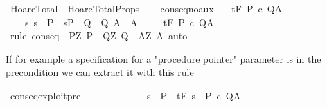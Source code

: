 %
\begin{isabellebody}%
%
%
\isamarkuptrue%
%
\isadelimtheory
%
\endisadelimtheory
%
\isatagtheory
{}\isamarkupfalse%
\ HoareTotal\ \ HoareTotalProps\ %
\endisatagtheory
{\isafoldtheory}%
%
\isadelimtheory
%
\endisadelimtheory
\ \isanewline
\isanewline
{}\isamarkupfalse%
\ conseq{\isacharunderscore}no{\isacharunderscore}aux{\isacharcolon}\isanewline
\ \ {\isachardoublequoteopen}{\isasymlbrakk}{\isasymGamma}{\isacharcomma}{\isasymTheta}\ {\isasymturnstile}\isactrlsub t\isactrlbsub {\isacharslash}F\isactrlesub \ P{\isacharprime}\ c\ Q{\isacharprime}{\isacharcomma}A{\isacharprime}{\isacharsemicolon}\isanewline
\ \ \ \ {\isasymforall}s{\isachardot}\ s\ {\isasymin}\ P\ {\isasymlongrightarrow}\ {\isacharparenleft}s{\isasymin}P{\isacharprime}\ {\isasymand}\ {\isacharparenleft}Q{\isacharprime}\ {\isasymsubseteq}\ Q{\isacharparenright}{\isasymand}\ {\isacharparenleft}A{\isacharprime}\ {\isasymsubseteq}\ A{\isacharparenright}{\isacharparenright}{\isasymrbrakk}\isanewline
\ \ {\isasymLongrightarrow}\isanewline
\ \ {\isasymGamma}{\isacharcomma}{\isasymTheta}{\isasymturnstile}\isactrlsub t\isactrlbsub {\isacharslash}F\isactrlesub \ P\ c\ Q{\isacharcomma}A{\isachardoublequoteclose}\isanewline
%
\isadelimproof
\ \ %
\endisadelimproof
%
\isatagproof
{}\isamarkupfalse%
\ {\isacharparenleft}rule\ conseq\ {\isacharbrackleft}\ P{\isacharprime}{\isacharequal}{\isachardoublequoteopen}{\isasymlambda}Z{\isachardot}\ P{\isacharprime}{\isachardoublequoteclose}\ \ Q{\isacharprime}{\isacharequal}{\isachardoublequoteopen}{\isasymlambda}Z{\isachardot}\ Q{\isacharprime}{\isachardoublequoteclose}\ \ A{\isacharprime}{\isacharequal}{\isachardoublequoteopen}{\isasymlambda}Z{\isachardot}\ A{\isacharprime}{\isachardoublequoteclose}{\isacharbrackright}{\isacharparenright}\ auto%
\endisatagproof
{\isafoldproof}%
%
\isadelimproof
%
\endisadelimproof
%
\begin{isamarkuptext}%
If for example a specification for a "procedure pointer" parameter 
is in the precondition we can extract it with this rule%
\end{isamarkuptext}\isamarkuptrue%
\isamarkupfalse%
\ conseq{\isacharunderscore}exploit{\isacharunderscore}pre{\isacharcolon}\isanewline
\ \ \ \ \ \ \ \ \ \ \ \ \ {\isachardoublequoteopen}{\isasymlbrakk}{\isasymforall}s\ {\isasymin}\ P{\isachardot}\ {\isasymGamma}{\isacharcomma}{\isasymTheta}\ {\isasymturnstile}\isactrlsub t\isactrlbsub {\isacharslash}F\isactrlesub \ {\isacharparenleft}{\isacharbraceleft}s{\isacharbraceright}\ {\isasyminter}\ P{\isacharparenright}\ c\ Q{\isacharcomma}A{\isasymrbrakk}\isanewline

\end{isabellebody}
